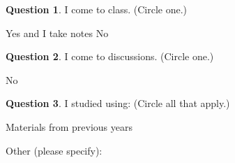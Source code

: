 \documentclass[11pt,oneside]{amsart}
\theoremstyle{definition}
\newtheorem{question}{Question}
\theoremstyle{plain}
\begin{document}
\begin{question}
  I come to class. (Circle one.)

  \hspace{1.5cm}\hspace{1.5cm}Yes and I take notes\hspace{1.5cm} No
\end{question}

\begin{question}
  I come to discussions. (Circle one.)

  \hspace{1.5cm}\hspace{1.5cm} No
\end{question}

\begin{question}
  I studied using: (Circle all that apply.)

  \hspace{1.5cm}\hspace{0.05\textwidth} \hspace{0.05\textwidth} Materials from previous years

  \hspace{1.5cm}Other (please specify): \underline{\hspace{8cm}}
\end{question}

\newpage
\end{document}
